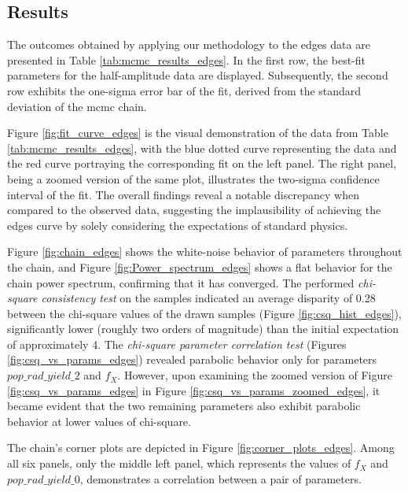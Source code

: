 \documentclass[12pt, TexShade, letterpaper]{report}
\begin{document}
\subsection{Results}
The outcomes obtained by applying our methodology to the \gls{edges} data are presented in Table \ref{tab:mcmc_results_edges}. In the first row, the best-fit parameters for the half-amplitude data are displayed. Subsequently, the second row exhibits the one-sigma error bar of the fit, derived from the standard deviation of the \gls{mcmc} chain. \par
Figure \ref{fig:fit_curve_edges} is the visual demonstration of the data from Table \ref{tab:mcmc_results_edges}, with the blue dotted curve representing the data and the red curve portraying the corresponding fit on the left panel. The right panel, being a zoomed version of the same plot, illustrates the two-sigma confidence interval of the fit. The overall findings reveal a notable discrepancy when compared to the observed data, suggesting the implausibility of achieving the \gls{edges} curve by solely considering the expectations of standard physics.\par
Figure \ref{fig:chain_edges} shows the white-noise behavior of parameters throughout the chain, and Figure \ref{fig:Power_spectrum_edges} shows a flat behavior for the chain power spectrum, confirming that it has converged. The performed \emph{chi-square consistency test} on the samples indicated an average disparity of 0.28 between the chi-square values of the drawn samples (Figure \ref{fig:csq_hist_edges}), significantly lower (roughly two orders of magnitude) than the initial expectation of approximately 4. The \emph{chi-square parameter correlation test} (Figures \ref{fig:csq_vs_params_edges}) revealed parabolic behavior only for parameters $pop\_rad\_yield\_2$ and $f_X$. However, upon examining the zoomed version of Figure \ref{fig:csq_vs_params_edges} in Figure \ref{fig:csq_vs_params_zoomed_edges}, it became evident that the two remaining parameters also exhibit parabolic behavior at lower values of chi-square.\par
The chain's corner plots are depicted in Figure \ref{fig:corner_plots_edges}. Among all six panels, only the middle left panel, which represents the values of $f_X$ and $pop\_rad\_yield\_0$, demonstrates a correlation between a pair of parameters.\par
\end{document}
